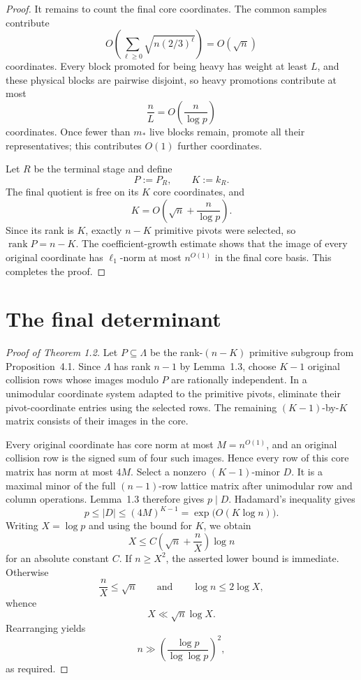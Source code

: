 \documentclass[10pt]{article}
\theoremstyle{definition}
\begin{document}
\begin{proof}
It remains to count the final core coordinates.  The common samples
contribute
\[
    O\!\left(\sum_{\ell\ge0}\sqrt{n(2/3)^\ell}\right)
      =O(\sqrt n)
\]
coordinates.  Every block promoted for being heavy has weight at least $L$,
and these physical blocks are pairwise disjoint, so heavy promotions
contribute at most
\[
    \frac nL=O\!\left(\frac n{\log p}\right)
\]
coordinates.  Once fewer than $m_*$ live blocks remain, promote all their
representatives; this contributes $O(1)$ further coordinates.

Let $R$ be the terminal stage and define
\[
    P:=P_R,
    \qquad
    K:=k_R.
\]
The final quotient is free on its $K$ core coordinates, and
\[
    K=O\!\left(\sqrt n+\frac n{\log p}\right).
\]
Since its rank is $K$, exactly $n-K$ primitive pivots were selected, so
$\operatorname{rank}P=n-K$.  The coefficient-growth estimate shows that the
image of every original coordinate has $\ell_1$-norm at most $n^{O(1)}$ in
the final core basis.  This completes the proof.
\end{proof}

\section{The final determinant}

\begin{proof}[Proof of Theorem 1.2]
Let $P\subseteq\Lambda$ be the rank-$(n-K)$ primitive subgroup from
Proposition~4.1.  Since $\Lambda$ has rank $n-1$ by Lemma~1.3, choose
$K-1$ original collision rows whose images modulo $P$ are rationally
independent.  In a unimodular coordinate system adapted to the primitive
pivots, eliminate their pivot-coordinate entries using the selected rows.
The remaining $(K-1)$-by-$K$ matrix consists of their images in the core.

Every original coordinate has core norm at most $M=n^{O(1)}$, and an
original collision row is the signed sum of four such images.  Hence every
row of this core matrix has norm at most $4M$.  Select a nonzero
$(K-1)$-minor $D$.  It is a maximal minor of the full $(n-1)$-row lattice
matrix after unimodular row and column operations.  Lemma~1.3 therefore
gives $p\mid D$.  Hadamard's inequality gives
\[
    p\le|D|\le(4M)^{K-1}=\exp\bigl(O(K\log n)\bigr).
\]
Writing $X=\log p$ and using the bound for $K$, we obtain
\[
    X\le C\left(\sqrt n+\frac nX\right)\log n
\]
for an absolute constant $C$.  If $n\ge X^2$, the asserted lower bound is
immediate.  Otherwise
\[
    \frac nX\le\sqrt n
    \qquad\text{and}\qquad
    \log n\le2\log X,
\]
whence
\[
    X\ll\sqrt n\log X.
\]
Rearranging yields
\[
    n\gg
    \left(\frac{\log p}{\log\log p}\right)^2,
\]
as required.
\end{proof}
\end{document}
